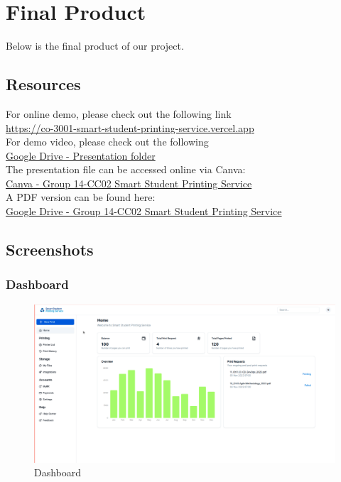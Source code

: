 \section{Final Product}

Below is the final product of our project. 

\subsection{Resources}

For online demo, please check out the following link\\
\indent\indent \href{https://co-3001-smart-student-printing-service.vercel.app}{https://co-3001-smart-student-printing-service.vercel.app}
\\
\indent For demo video, please check out the following\\
\indent \indent \href{https://drive.google.com/drive/u/1/folders/1nSVqsj9_NubFQLUs2wFIGpq8M5zzPma2}{Google Drive - Presentation folder}
\\
\indent The presentation file can be accessed online via Canva:
\\
\indent \indent \href{https://www.canva.com/design/DAF2IG6wHOs/ovgEZU43pdSsiCqPl_B5uw/view}{Canva - Group 14-CC02 Smart Student Printing Service}
\\
\indent A PDF version can be found here:
\\
\indent \indent \href{https://drive.google.com/file/d/1c7-psaLMC4-su2_llzabOld_COfxqFA7/view?usp=sharing}{Google Drive - Group 14-CC02 Smart Student Printing Service}
\\

\subsection{Screenshots}

\subsubsection{Dashboard}

\begin{figure}[H]
    \centering
    \includegraphics[max width = 0.9\linewidth,origin = c]{chapters/8. Implementation - Sprint 2/1. Dashboard.png}
    \caption{Dashboard}%
\end{figure}

